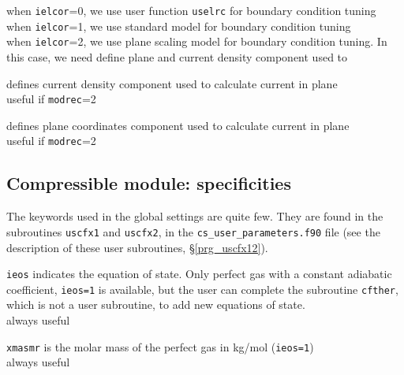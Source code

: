 {when \texttt{ielcor}=0, we use user function \texttt{uselrc} for boundary condition tuning\\
when \texttt{ielcor}=1, we use standard model for boundary condition tuning\\
when \texttt{ielcor}=2, we use plane scaling model for boundary condition tuning. In this case, we need
define plane and current density component used to}

{defines current density component used to calculate current in plane\\
useful if \texttt{modrec}=2}

{defines plane coordinates component used to calculate current in plane\\
useful if \texttt{modrec}=2}

\subsection{Compressible module: specificities}

The keywords used in the global settings are quite few. They are
found in the subroutines \texttt{uscfx1} and \texttt{uscfx2}, in
the \texttt{cs\_user\_parameters.f90} file (see the
description of these user subroutines, \S\ref{prg_uscfx12}).

{\texttt{ieos} indicates the equation of state. Only perfect gas with a constant adiabatic coefficient,
\texttt{ieos=1} is available, but the user can complete the subroutine
\texttt{cfther}, which is not a user subroutine, to add new equations of state.\\
always useful
}

{\texttt{xmasmr} is the molar mass of the perfect gas in kg/mol (\texttt{ieos=1})\\
always useful
}

